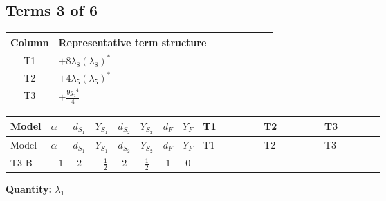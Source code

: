 \documentclass[8pt]{article}
\begin{document}
\begin{landscape}
\subsection*{Terms 3 of 6}
\begin{center}
\begin{tabular}{@{}c >{\raggedright\arraybackslash}p{0.82\linewidth}@{}}
\toprule
Column & Representative term structure \\
\midrule
T1 & \(\displaystyle +8 {\lambda_8} \left({\lambda_8}\right)^{*}\) \\
\midrule
T2 & \(\displaystyle +4 {\lambda_5} \left({\lambda_5}\right)^{*}\) \\
\midrule
T3 & \(\displaystyle +\frac{9 {g_2}^4}{4}\) \\
\midrule
\bottomrule
\end{tabular}
\end{center}
\smallskip
\tiny
\begin{longtable}{@{}llcccccc >{\raggedright\arraybackslash}p{0.21\linewidth} >{\raggedright\arraybackslash}p{0.21\linewidth} >{\raggedright\arraybackslash}p{0.21\linewidth}@{}}
\toprule
Model & $\alpha$ & $d_{S_1}$ & $Y_{S_1}$ & $d_{S_2}$ & $Y_{S_2}$ & $d_F$ & $Y_F$ & T1 & T2 & T3 \\
\midrule
\endfirsthead
\toprule
Model & $\alpha$ & $d_{S_1}$ & $Y_{S_1}$ & $d_{S_2}$ & $Y_{S_2}$ & $d_F$ & $Y_F$ & T1 & T2 & T3 \\
\midrule
\endhead
T3-B & $-1$ & $2$ & $-\frac{1}{2}$ & $2$ & $\frac{1}{2}$ & $1$ & $0$ & \scriptsize\adjustbox{max width=\linewidth}{$\begin{gathered} +8 {\lambda_8} \left({\lambda_8}\right)^{*}\end{gathered}$} & \scriptsize\adjustbox{max width=\linewidth}{$\begin{gathered} +4 {\lambda_5} \left({\lambda_5}\right)^{*}\end{gathered}$} & \scriptsize\adjustbox{max width=\linewidth}{$\begin{gathered} +\frac{9 {g_2}^4}{4}\end{gathered}$} \\
\midrule
\bottomrule
\end{longtable}
\clearpage
\noindent\textbf{Quantity: }$\lambda_1$\par\smallskip

\end{landscape}
\end{document}
